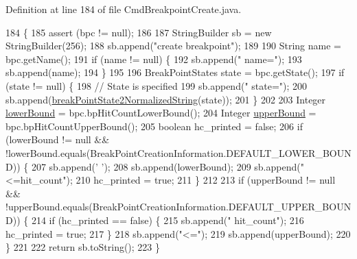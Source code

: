 Definition at line 184 of file Cmd\+Breakpoint\+Create.\+java.


\begin{DoxyCode}
184                                                                                            \{
185       assert (bpc != null);
186 
187       StringBuilder sb = \textcolor{keyword}{new} StringBuilder(256);
188       sb.append(\textcolor{stringliteral}{"create breakpoint"});
189 
190       String name = bpc.getName();
191       \textcolor{keywordflow}{if} (name != null) \{
192         sb.append(\textcolor{stringliteral}{" name="});
193         sb.append(name);
194       \}
195 
196       BreakPointStates state = bpc.getState();
197       \textcolor{keywordflow}{if} (state != null) \{
198         \textcolor{comment}{// State is specified}
199         sb.append(\textcolor{stringliteral}{" state="});
200         sb.append(\hyperlink{classgov_1_1nasa_1_1jpf_1_1inspector_1_1client_1_1commands_1_1_cmd_breakpoint_create_1_1_console_breakpoint_creation_expression_a4ce446ae4313e893c81b66d39ba144a2}{breakPointState2NormalizedString}(state));
201       \}
202 
203       Integer \hyperlink{classgov_1_1nasa_1_1jpf_1_1inspector_1_1client_1_1commands_1_1_cmd_breakpoint_create_1_1_console_breakpoint_creation_expression_abead53f102cf591c076f2b60dbb630cf}{lowerBound} = bpc.bpHitCountLowerBound();
204       Integer \hyperlink{classgov_1_1nasa_1_1jpf_1_1inspector_1_1client_1_1commands_1_1_cmd_breakpoint_create_1_1_console_breakpoint_creation_expression_afc19a93fec068e4fc73750253deea264}{upperBound} = bpc.bpHitCountUpperBound();
205       \textcolor{keywordtype}{boolean} hc\_printed = \textcolor{keyword}{false};
206       \textcolor{keywordflow}{if} (lowerBound != null && !lowerBound.equals(BreakPointCreationInformation.DEFAULT\_LOWER\_BOUND)) \{
207         sb.append(\textcolor{charliteral}{' '});
208         sb.append(lowerBound);
209         sb.append(\textcolor{stringliteral}{"<=hit\_count"});
210         hc\_printed = \textcolor{keyword}{true};
211       \}
212 
213       \textcolor{keywordflow}{if} (upperBound != null && !upperBound.equals(BreakPointCreationInformation.DEFAULT\_UPPER\_BOUND)) \{
214         \textcolor{keywordflow}{if} (hc\_printed == \textcolor{keyword}{false}) \{
215           sb.append(\textcolor{stringliteral}{" hit\_count"});
216           hc\_printed = \textcolor{keyword}{true};
217         \}
218         sb.append(\textcolor{stringliteral}{"<="});
219         sb.append(upperBound);
220       \}
221 
222       \textcolor{keywordflow}{return} sb.toString();
223     \}
\end{DoxyCode}

